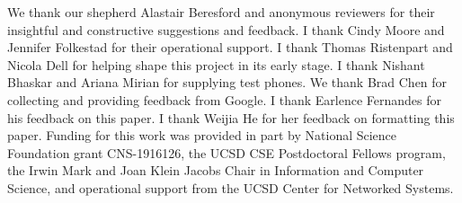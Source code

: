 \begin{acks}
We thank our shepherd Alastair Beresford and anonymous reviewers for their insightful and
constructive suggestions and feedback. I thank Cindy Moore and Jennifer Folkestad for
their operational support. I thank Thomas Ristenpart and Nicola Dell for helping shape this project in its early stage. I thank Nishant Bhaskar and Ariana Mirian for supplying test phones.
We thank Brad Chen for collecting and providing feedback from Google. I thank Earlence Fernandes for his feedback on this paper. I thank Weijia He for her feedback on formatting this paper.
Funding for this work was provided in part by National Science
Foundation grant CNS-1916126,
the UCSD CSE
Postdoctoral Fellows program, the Irwin Mark and Joan Klein Jacobs
Chair in Information and Computer Science,
and operational support from the UCSD Center for Networked Systems.

\end{acks}
